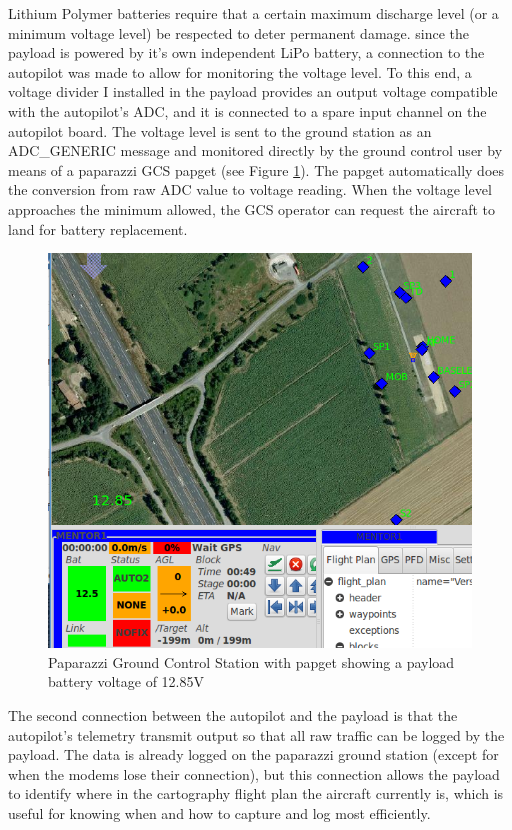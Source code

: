 \documentclass[a4paper,11pt]{report}
\begin{document}
Lithium Polymer batteries require that a certain maximum discharge level (or a minimum voltage level) be respected to deter permanent damage. since the payload is powered by it's own independent LiPo battery, a connection to the autopilot was made to allow for monitoring the voltage level. To this end, a voltage divider I installed in the payload provides an output voltage compatible with the autopilot's ADC, and it is connected to a spare input channel on the autopilot board. The voltage level is sent to the ground station as an ADC\_GENERIC message and monitored directly by the ground control user by means of a paparazzi GCS papget (see Figure \ref{fig:papget}). The papget automatically does the conversion from raw ADC value to voltage reading. When the voltage level approaches the minimum allowed, the GCS operator can request the aircraft to land for battery replacement.

\begin{figure}[htb]
 \centering
 \includegraphics[width=12cm]{papget.png}
 \caption{Paparazzi Ground Control Station with papget showing a payload battery voltage of 12.85V}
 \label{fig:papget}
\end{figure}

The second connection between the autopilot and the payload is that the autopilot's telemetry transmit output so that all raw traffic can be logged by the payload. The data is already logged on the paparazzi ground station (except for when the modems lose their connection), but this connection allows the payload to identify where in the cartography flight plan the aircraft currently is, which is useful for knowing when and how to capture and log most efficiently. 
\end{document}
